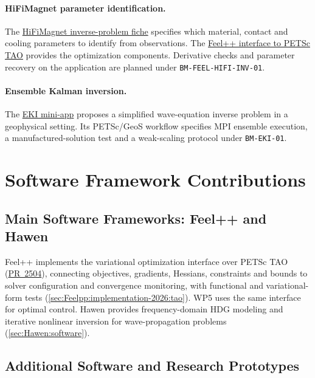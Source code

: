 \paragraph{HiFiMagnet parameter identification.}
The \hyperref[sec:app:specs:app-feelpp-hifimagnet-inverse]{HiFiMagnet
inverse-problem fiche} specifies which material, contact and cooling
parameters to identify from observations. The
\hyperref[sec:Feelpp:implementation-2026:tao]{Feel++ interface to PETSc TAO}
provides the optimization components. Derivative checks and parameter
recovery on the application are planned under \nolinkurl{BM-FEEL-HIFI-INV-01}.

\paragraph{Ensemble Kalman inversion.}
The \hyperref[sec:app:specs:app-eki]{EKI mini-app} proposes a simplified
wave-equation inverse problem in a geophysical setting. Its PETSc/GeoS
workflow specifies MPI ensemble execution, a manufactured-solution
test and a weak-scaling protocol under \nolinkurl{BM-EKI-01}.

\section{Software Framework Contributions}
\label{sec:wp4:software}

\subsection{Main Software Frameworks: Feel++ and Hawen}

Feel++ implements the variational optimization interface over PETSc TAO
(\href{https://github.com/feelpp/feelpp/pull/2504}{PR~2504}), connecting
objectives, gradients, Hessians, constraints and bounds to solver configuration
and convergence monitoring, with functional and variational-form tests
(\cref{sec:Feelpp:implementation-2026:tao}). WP5 uses the same interface for
optimal control. Hawen provides frequency-domain HDG modeling and iterative
nonlinear inversion for wave-propagation problems (\cref{sec:Hawen:software}).

\subsection{Additional Software and Research Prototypes}

